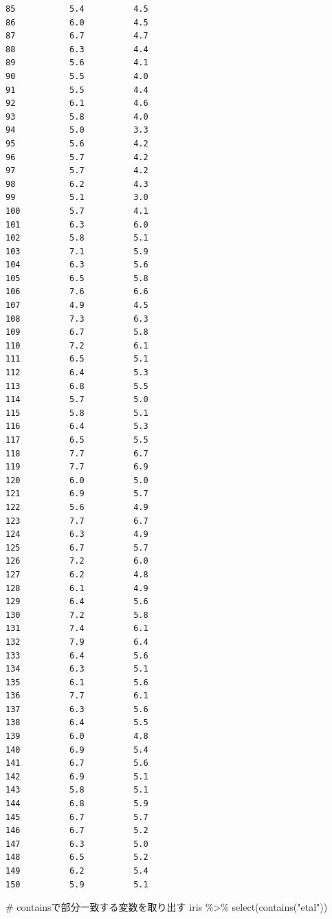 \documentclass[
  a4paper,
]{ltjsbook}
\newenvironment{Shaded}{\begin{snugshade}}{\end{snugshade}}
\newcommand{\CommentTok}[1]{\textcolor[rgb]{0.37,0.37,0.37}{#1}}
\newcommand{\FunctionTok}[1]{\textcolor[rgb]{0.28,0.35,0.67}{#1}}
\newcommand{\NormalTok}[1]{\textcolor[rgb]{0.00,0.23,0.31}{#1}}
\newcommand{\SpecialCharTok}[1]{\textcolor[rgb]{0.37,0.37,0.37}{#1}}
\newcommand{\StringTok}[1]{\textcolor[rgb]{0.13,0.47,0.30}{#1}}
\begin{document}
\begin{verbatim}
85           5.4          4.5
86           6.0          4.5
87           6.7          4.7
88           6.3          4.4
89           5.6          4.1
90           5.5          4.0
91           5.5          4.4
92           6.1          4.6
93           5.8          4.0
94           5.0          3.3
95           5.6          4.2
96           5.7          4.2
97           5.7          4.2
98           6.2          4.3
99           5.1          3.0
100          5.7          4.1
101          6.3          6.0
102          5.8          5.1
103          7.1          5.9
104          6.3          5.6
105          6.5          5.8
106          7.6          6.6
107          4.9          4.5
108          7.3          6.3
109          6.7          5.8
110          7.2          6.1
111          6.5          5.1
112          6.4          5.3
113          6.8          5.5
114          5.7          5.0
115          5.8          5.1
116          6.4          5.3
117          6.5          5.5
118          7.7          6.7
119          7.7          6.9
120          6.0          5.0
121          6.9          5.7
122          5.6          4.9
123          7.7          6.7
124          6.3          4.9
125          6.7          5.7
126          7.2          6.0
127          6.2          4.8
128          6.1          4.9
129          6.4          5.6
130          7.2          5.8
131          7.4          6.1
132          7.9          6.4
133          6.4          5.6
134          6.3          5.1
135          6.1          5.6
136          7.7          6.1
137          6.3          5.6
138          6.4          5.5
139          6.0          4.8
140          6.9          5.4
141          6.7          5.6
142          6.9          5.1
143          5.8          5.1
144          6.8          5.9
145          6.7          5.7
146          6.7          5.2
147          6.3          5.0
148          6.5          5.2
149          6.2          5.4
150          5.9          5.1
\end{verbatim}

\begin{Shaded}
\begin{Highlighting}[]
\CommentTok{\# containsで部分一致する変数を取り出す}
\NormalTok{iris }\SpecialCharTok{\%\textgreater{}\%} \FunctionTok{select}\NormalTok{(}\FunctionTok{contains}\NormalTok{(}\StringTok{"etal"}\NormalTok{))}
\end{Highlighting}
\end{Shaded}
\end{document}
